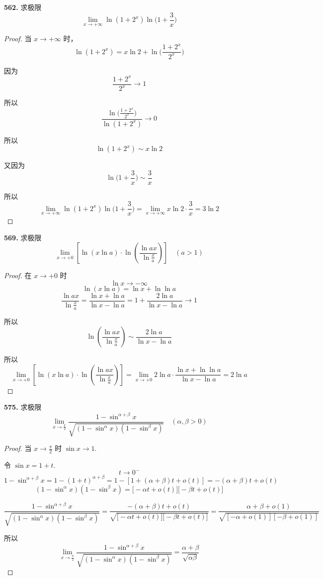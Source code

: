 \textbf{562.} 求极限
\[\lim_{x \rightarrow +\infty} \ln(1 + 2^x) \ln \biggl(1 + \frac{3}{x}\biggr)\]
\begin{proof}
    当 $x \rightarrow +\infty$ 时，
    \[\ln(1 + 2^x) = x\ln 2 + \ln \biggl(\frac{1 + 2^x}{2^x}\biggr)\]

    因为
    \[\frac{1 + 2^x}{2^x} \rightarrow 1\]

    所以
    \[\frac{\ln \bigl(\frac{1 + 2^x}{2^x}\bigr)}{\ln(1 + 2^x)} \rightarrow 0\]

    所以
    \[\ln(1 + 2^x) \sim x \ln 2\]

    又因为
    \[\ln \biggl(1 + \frac{3}{x}\biggr) \sim \frac{3}{x}\]

    所以
    \[\lim_{x \rightarrow +\infty} \ln(1 + 2^x) \ln \biggl(1 + \frac{3}{x}\biggr) = \lim_{x \rightarrow +\infty} x\ln 2 \cdot \frac{3}{x} = 3\ln2\]
\end{proof}\vspace{9pt}

\textbf{569.} 求极限
\[\lim_{x \rightarrow +0} \left[\ln(x \ln a) \cdot \ln \left(\frac{\ln ax}{\ln \frac{x}{a}}\right)\right] \quad (a > 1)\]
\begin{proof}
    在 $x \rightarrow +0$ 时
    \[\ln x \rightarrow -\infty\]
    \[\ln(x \ln a) = \ln x + \ln \ln a\]
    \[\frac{\ln ax}{\ln \frac{x}{a}} = \frac{\ln x + \ln a}{\ln x - \ln a} = 1 + \frac{2\ln a}{\ln x - \ln a} \rightarrow 1\]

    所以
    \[\ln \left(\frac{\ln ax}{\ln \frac{x}{a}}\right) \sim \frac{2\ln a}{\ln x - \ln a}\]

    所以
    \[\lim_{x \rightarrow +0} \left[\ln(x \ln a) \cdot \ln \left(\frac{\ln ax}{\ln \frac{x}{a}}\right)\right] = \lim_{x \rightarrow +0} 2\ln a \cdot \frac{\ln x + \ln \ln a}{\ln x - \ln a} = 2\ln a\]
\end{proof}\vspace{9pt}

\textbf{575.} 求极限
\[\lim_{x \rightarrow \frac{\pi}{2}} \frac{1 - \sin^{\alpha + \beta}x}{\sqrt{(1 - \sin^\alpha x)(1 - \sin^\beta x)}} \quad (\alpha, \beta > 0)\]

\begin{proof}
    当 $\displaystyle x \rightarrow \frac{\pi}{2}$ 时 $\sin x \rightarrow 1$.

    令 $\sin x = 1 + t$.
    \[t \rightarrow 0^-\]
    \[1 - \sin^{\alpha + \beta} x = 1 - (1 + t)^{\alpha + \beta} = 1 - [1 + (\alpha + \beta)t + o(t)] = -(\alpha + \beta)t + o(t)\]
    \[(1 - \sin^\alpha x)(1 - \sin^\beta x) = \bigl[-\alpha t + o(t)\bigr]\bigl[-\beta t + o(t)\bigr]\]

    \[\frac{1 - \sin^{\alpha + \beta}x}{\sqrt{(1 - \sin^\alpha x)(1 - \sin^\beta x)}} = \frac{-(\alpha + \beta)t + o(t)}{\sqrt{\bigl[-\alpha t + o(t)\bigr]\bigl[-\beta t + o(t)\bigr]}} = \frac{\alpha + \beta + o(1)}{\sqrt{[-\alpha + o(1)][-\beta + o(1)]}}\]

    所以
    \[\lim_{x \rightarrow \frac{\pi}{2}} \frac{1 - \sin^{\alpha + \beta}x}{\sqrt{(1 - \sin^\alpha x)(1 - \sin^\beta x)}} = \frac{\alpha + \beta}{\sqrt{\alpha \beta}}\]
\end{proof}\vspace{9pt}

